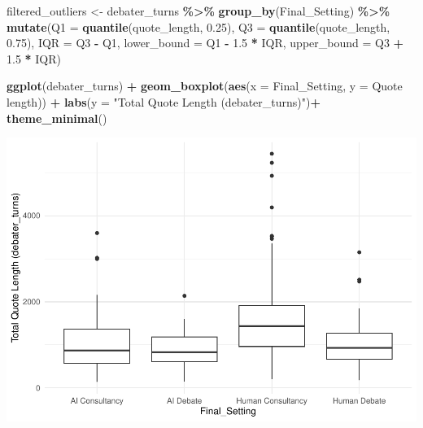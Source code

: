 \documentclass[
]{article}
\newenvironment{Shaded}{\begin{snugshade}}{\end{snugshade}}
\newcommand{\AttributeTok}[1]{\textcolor[rgb]{0.13,0.29,0.53}{#1}}
\newcommand{\FloatTok}[1]{\textcolor[rgb]{0.00,0.00,0.81}{#1}}
\newcommand{\FunctionTok}[1]{\textcolor[rgb]{0.13,0.29,0.53}{\textbf{#1}}}
\newcommand{\NormalTok}[1]{#1}
\newcommand{\OtherTok}[1]{\textcolor[rgb]{0.56,0.35,0.01}{#1}}
\newcommand{\SpecialCharTok}[1]{\textcolor[rgb]{0.81,0.36,0.00}{\textbf{#1}}}
\newcommand{\StringTok}[1]{\textcolor[rgb]{0.31,0.60,0.02}{#1}}
\begin{document}
\begin{Shaded}
\begin{Highlighting}[]
\NormalTok{filtered\_outliers }\OtherTok{\textless{}{-}}\NormalTok{ debater\_turns }\SpecialCharTok{\%\textgreater{}\%}
  \FunctionTok{group\_by}\NormalTok{(Final\_Setting) }\SpecialCharTok{\%\textgreater{}\%}
  \FunctionTok{mutate}\NormalTok{(}\AttributeTok{Q1 =} \FunctionTok{quantile}\NormalTok{(quote\_length, }\FloatTok{0.25}\NormalTok{),}
         \AttributeTok{Q3 =} \FunctionTok{quantile}\NormalTok{(quote\_length, }\FloatTok{0.75}\NormalTok{),}
         \AttributeTok{IQR =}\NormalTok{ Q3 }\SpecialCharTok{{-}}\NormalTok{ Q1,}
         \AttributeTok{lower\_bound =}\NormalTok{ Q1 }\SpecialCharTok{{-}} \FloatTok{1.5} \SpecialCharTok{*}\NormalTok{ IQR,}
         \AttributeTok{upper\_bound =}\NormalTok{ Q3 }\SpecialCharTok{+} \FloatTok{1.5} \SpecialCharTok{*}\NormalTok{ IQR)}

\FunctionTok{ggplot}\NormalTok{(debater\_turns) }\SpecialCharTok{+}
  \FunctionTok{geom\_boxplot}\NormalTok{(}\FunctionTok{aes}\NormalTok{(}\AttributeTok{x =}\NormalTok{ Final\_Setting, }\AttributeTok{y =} \StringTok{\textasciigrave{}}\AttributeTok{Quote length}\StringTok{\textasciigrave{}}\NormalTok{)) }\SpecialCharTok{+}
  \FunctionTok{labs}\NormalTok{(}\AttributeTok{y =} \StringTok{"Total Quote Length (debater\_turns)"}\NormalTok{)}\SpecialCharTok{+}
  \FunctionTok{theme\_minimal}\NormalTok{()}
\end{Highlighting}
\end{Shaded}

\includegraphics[width=1\linewidth]{debate-2309_files/figure-latex/quote_length graph-2}
\end{document}
